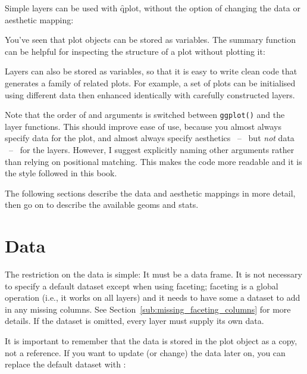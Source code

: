 Simple layers can be used with \f{qplot}, without the option of changing the data or aesthetic mapping:

% 


You've seen that plot objects can be stored as variables. The summary function can be helpful for inspecting the structure of a plot without plotting it:

%
%


Layers can also be stored as variables, so that it is easy to write clean code that generates a family of related plots.  For example, a set of plots can be initialised using different data then enhanced identically with carefully constructed layers.

Note that the order of  and  arguments is switched between {\tt ggplot()} and the layer functions.  This should improve ease of use, because you almost always specify data for the plot, and almost always specify aesthetics ~--~ but {\em not} data ~--~ for the layers.  However, I suggest explicitly naming other arguments rather than relying on positional matching.  This makes the code more readable and it is the style followed in this book.

The following sections describe the data and aesthetic mappings in more detail, then go on to describe the available geoms and stats.

\section{Data}
\label{sec:data}

The restriction on the data is simple: It must be a data frame.  It is not necessary to specify a default dataset except when using faceting; faceting is a global operation (i.e., it works on all layers) and it needs to have some a dataset to add in any missing columns.  See Section~\ref{sub:missing_faceting_columns} for more details.  If the dataset is omitted, every layer must supply its own data.

It is important to remember that the data is stored in the plot object as a copy, not a reference.  If you want to update (or change) the data later on, you can replace the default dataset with \code{\%+\%}:

